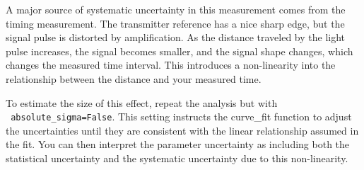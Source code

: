 A major source of systematic uncertainty in this measurement comes
from the timing measurement.  The transmitter reference has a nice
sharp edge, but the signal pulse is distorted by amplification.  As
the distance traveled by the light pulse increases, the signal becomes
smaller, and the signal shape changes, which changes the measured time
interval.  This introduces a non-linearity into the relationship between
the distance and your measured time.

\begin{plot}
To estimate the size of this effect, repeat the analysis but with \\ {\tt
  absolute{\_}sigma=False}.  This setting instructs the {\rm
  curve{\_}fit} function to adjust the uncertainties until they are
consistent with the linear relationship assumed in the fit.  You can
then interpret the parameter uncertainty as including both the
statistical uncertainty and the systematic uncertainty due to this
non-linearity.
\end{plot}

